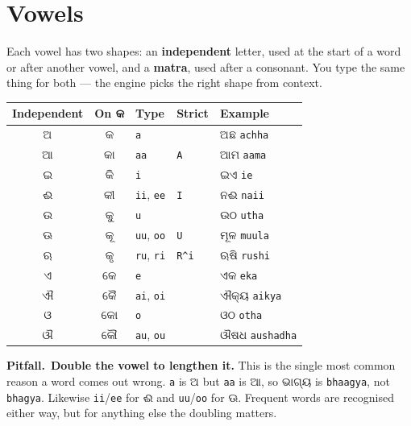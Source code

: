\documentclass[11pt, a4paper]{article}
\newcommand{\od}[1]{{\odiafont #1}}          %
\newcommand{\odb}[1]{{\odiafont\large #1}}   %
\newcommand{\kpit}{{\color{midseaorange!85!black}\textbf{\textsf{Pitfall.}}}\ }
\begin{document}
\section{Vowels}

Each vowel has two shapes: an \textbf{independent} letter, used at the start of a word or
after another vowel, and a \textbf{matra}, used after a consonant. You type the same
thing for both --- the engine picks the right shape from context.

\begin{center}
\begin{tabular}{c c l l l}
\toprule
Independent & On \od{କ} & Type & Strict & Example \\
\midrule
\odb{ଅ}  & \odb{କ}   & \texttt{a}   &                & \od{ଅଛ} \texttt{achha} \\
\odb{ଆ}  & \odb{କା}  & \texttt{aa}  & \texttt{A}     & \od{ଆମ} \texttt{aama} \\
\odb{ଇ}  & \odb{କି}  & \texttt{i}   &                & \od{ଇଏ} \texttt{ie} \\
\odb{ଈ}  & \odb{କୀ}  & \texttt{ii}, \texttt{ee} & \texttt{I} & \od{ନଈ} \texttt{naii} \\
\odb{ଉ}  & \odb{କୁ}  & \texttt{u}   &                & \od{ଉଠ} \texttt{utha} \\
\odb{ଊ}  & \odb{କୂ}  & \texttt{uu}, \texttt{oo} & \texttt{U} & \od{ମୂଳ} \texttt{muula} \\
\odb{ଋ}  & \odb{କୃ}  & \texttt{ru}, \texttt{ri} & \texttt{R\^{}i} & \od{ଋଷି} \texttt{rushi} \\
\odb{ଏ}  & \odb{କେ}  & \texttt{e}   &                & \od{ଏକ} \texttt{eka} \\
\odb{ଐ}  & \odb{କୈ}  & \texttt{ai}, \texttt{oi} &     & \od{ଐକ୍ୟ} \texttt{aikya} \\
\odb{ଓ}  & \odb{କୋ}  & \texttt{o}   &                & \od{ଓଠ} \texttt{otha} \\
\odb{ଔ}  & \odb{କୌ}  & \texttt{au}, \texttt{ou} &     & \od{ଔଷଧ} \texttt{aushadha} \\
\bottomrule
\end{tabular}
\end{center}

\begin{warnbox}
\kpit \textbf{Double the vowel to lengthen it.} This is the single most common reason a
word comes out wrong. \texttt{a} is \od{ଅ} but \texttt{aa} is \od{ଆ}, so \od{ଭାଗ୍ୟ} is
\texttt{bhaagya}, not \texttt{bhagya}. Likewise \texttt{ii}/\texttt{ee} for \od{ଈ} and
\texttt{uu}/\texttt{oo} for \od{ଊ}. Frequent words are recognised either way, but for
anything else the doubling matters.
\end{warnbox}
\end{document}
